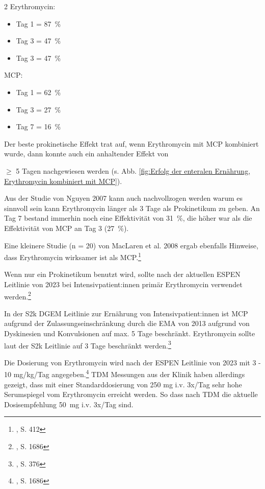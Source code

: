\documentclass{article}
\begin{document}
\begin{multicols}{2}
  Erythromycin: 
  \begin{itemize}
    \item[-] Tag 1 = 87~\%
    \item[-] Tag 3 = 47~\%    
    \item[-] Tag 3 = 47~\%    
  \end{itemize}

  MCP:
  \begin{itemize}
    \item[-] Tag 1 = 62~\%
    \item[-] Tag 3 = 27~\%
    \item[-] Tag 7 = 16~\%
  \end{itemize}

  Der beste prokinetische Effekt trat auf, wenn Erythromycin mit MCP kombiniert wurde, dann konnte auch ein anhaltender Effekt von $\geq$ 5 Tagen nachgewiesen werden (s. Abb. \ref{fig:Erfolg der enteralen Ernährung, Erythromycin kombiniert mit MCP}). 

  Aus der Studie von Nguyen 2007 kann auch nachvollzogen werden warum es sinnvoll sein kann Erythromycin länger als 3 Tage als Prokinetikum zu geben. An Tag 7 bestand immerhin noch eine Effektivität von 31~\%, die höher war als die Effektivität von MCP an Tag 3 (27~\%). 

  Eine kleinere Studie (n = 20) von MacLaren et al. 2008 ergab ebenfalls Hinweise, dass Erythromycin wirksamer ist als MCP.\footnote{\cite{maclaren2008ErythromycinVsMetoclopramide}, S. 412}

  Wenn nur ein Prokinetikum benutzt wird, sollte nach der aktuellen ESPEN Leitlinie von 2023 bei Intensivpatient:innen primär Erythromycin verwendet werden.\footnote{\cite{singer2023ESPENPracticalPartially}, S. 1686}

  In der S2k DGEM Leitlinie zur Ernährung von Intensivpatient:innen ist MCP aufgrund der Zulassungseinschränkung durch die EMA von 2013 aufgrund von Dyskinesien und Konvulsionen auf max. 5 Tage beschränkt. Erythromycin sollte laut der S2k Leitlinie auf 3 Tage beschränkt werden.\footnote{\cite{elke2019DGEMS2kLeitlinieKlinische}, S. 376} 

  Die Dosierung von Erythromycin wird nach der ESPEN Leitlinie von 2023 mit 3 - 10 mg/kg/Tag angegeben.\footnote{\cite{singer2023ESPENPracticalPartially}, S. 1686} TDM Messungen aus der Klinik haben allerdings gezeigt, dass mit einer Standarddosierung von 250 mg i.v. 3x/Tag sehr hohe Serumspiegel vom Erythromycin erreicht werden. So dass nach TDM die aktuelle Dosisempfehlung 50~mg i.v. 3x/Tag sind.


\end{multicols}
\end{document}

